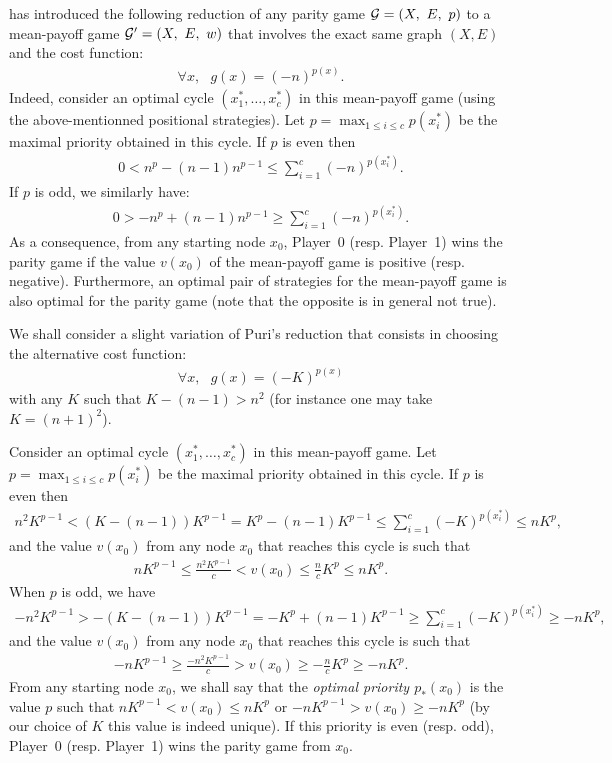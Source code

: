 \documentclass{article}
\def\G{{\cal G}}
\def\pa{Player~0}
\def\pb{Player~1}
\begin{document}
\citet{puri96} has introduced the following reduction of any parity game $\G=(X, ~E,~ p)$ to a mean-payoff game $\G'=(X,~ E,~ w)$ that involves the exact same graph $(X,E)$ and the cost function:
\begin{align}
  \forall x,~~~ g(x) = (-n)^{p(x)}.
\end{align}
Indeed, consider an optimal cycle $(x^*_1,\dots,x^*_c)$ in this mean-payoff game (using the above-mentionned positional strategies). Let $p=\max_{1 \le i \le c} p(x^*_i)$ be the maximal priority obtained in this cycle. If $p$ is even then
\begin{align}
 0 <  n^{p} - (n-1) n^{p-1} \le  \sum_{i=1}^{c} (-n)^{p(x^*_i)}.
\end{align}
If $p$ is odd, we similarly have:
\begin{align}
0 > -n^{p} + (n-1) n^{p-1} \ge   \sum_{i=1}^{c} (-n)^{p(x^*_i)}.
\end{align}
As a consequence, from any starting node $x_0$, \pa{ }(resp. \pb) wins the parity game if the value $v(x_0)$ of the mean-payoff game  is positive (resp. negative). Furthermore, an optimal pair of strategies for the mean-payoff game is also optimal for the parity game (note that the opposite is in general not true).

We shall consider a slight variation of Puri's reduction that consists in choosing the alternative cost function:
\begin{align}
  \forall x,~~~ g(x) = (-K)^{p(x)}
\end{align}
with any $K$ such that $K-(n-1) > n^2$
(for instance one may take $K=(n+1)^2$).

Consider an optimal cycle $(x^*_1,\dots,x^*_c)$ in this mean-payoff game. Let $p=\max_{1 \le i \le c} p(x^*_i)$ be the maximal priority obtained in this cycle. If $p$ is even then
\begin{align}
n^2 K^{p-1} <  (K-(n-1))K^{p-1} =   K^p - (n-1) K^{p-1}  \le \sum_{i=1}^{c} (-K)^{p(x^*_i)} \le n K^p,
\end{align}
and the value $v(x_0)$ from any node $x_0$ that reaches this cycle is such that
\begin{align}
  n K^{p-1} \le \frac{n^2 K^{p-1}}{c} < v(x_0) \le \frac{n}{c} K^p \le n K^p. 
\end{align}
When $p$ is odd, we have
\begin{align}
  - n^2 K^{p-1} > -(K-(n-1))K^{p-1} =   -K^p + (n-1) K^{p-1} \ge \sum_{i=1}^{c} (-K)^{p(x^*_i)} \ge -n K^p,
\end{align}
and the value $v(x_0)$ from any node $x_0$ that reaches this cycle is such that
\begin{align}
  -n K^{p-1} \ge \frac{-n^2 K^{p-1}}{c} > v(x_0) \ge -\frac{n}{c}K^p \ge - n K^p. 
\end{align}
From any starting node $x_0$, we shall say that the \emph{optimal priority $p_*(x_0)$} is the value $p$ such that $n K^{p-1} < v(x_0) \le n K^p$ or $-n K^{p-1} > v(x_0) \ge -n K^p$ (by our choice of $K$ this value is indeed unique). If this priority is even (resp. odd), \pa{ }(resp. \pb) wins the parity game from $x_0$.
\end{document}
